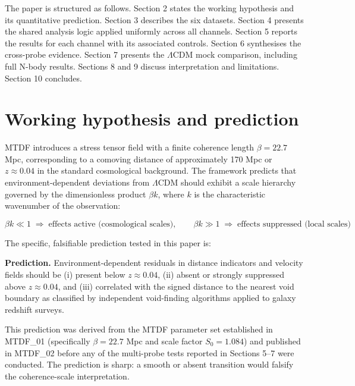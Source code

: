 \documentclass[11pt,a4paper]{article}
\begin{document}
The paper is structured as follows. Section 2 states the working hypothesis and its quantitative prediction. Section 3 describes the six datasets. Section 4 presents the shared analysis logic applied uniformly across all channels. Section 5 reports the results for each channel with its associated controls. Section 6 synthesises the cross-probe evidence. Section 7 presents the \(\Lambda\)CDM mock comparison, including full N-body results. Sections 8 and 9 discuss interpretation and limitations. Section 10 concludes.

\section{Working hypothesis and prediction}
\label{sec:sec2}
MTDF introduces a stress tensor field with a finite coherence length \(\beta = 22.7\) Mpc, corresponding to a comoving distance of approximately 170 Mpc or \(z \approx 0.04\) in the standard cosmological background. The framework predicts that environment-dependent deviations from \(\Lambda\)CDM should exhibit a scale hierarchy governed by the dimensionless product \(\beta k\), where \(k\) is the characteristic wavenumber of the observation:

\[
\beta k \ll 1 \;\Rightarrow\; \text{effects active (cosmological scales)}, \qquad
\beta k \gg 1 \;\Rightarrow\; \text{effects suppressed (local scales)}
\]

The specific, falsifiable prediction tested in this paper is:

\begin{mdframed}[linecolor=accent,linewidth=0.5pt,backgroundcolor=callout-bg,leftline=true,rightline=true,topline=true,bottomline=true,innerleftmargin=8pt,innerrightmargin=8pt,innertopmargin=6pt,innerbottommargin=6pt]
\textbf{Prediction.} Environment-dependent residuals in distance indicators and velocity fields should be (i) present below \(z \approx 0.04\), (ii) absent or strongly suppressed above \(z \approx 0.04\), and (iii) correlated with the signed distance to the nearest void boundary as classified by independent void-finding algorithms applied to galaxy redshift surveys.
\end{mdframed}

This prediction was derived from the MTDF parameter set established in MTDF\_\allowbreak{}01 (specifically \(\beta = 22.7\) Mpc and scale factor \(S_0 = 1.084\)) and published in MTDF\_\allowbreak{}02 before any of the multi-probe tests reported in Sections 5--7 were conducted. The prediction is sharp: a smooth or absent transition would falsify the coherence-scale interpretation.
\end{document}

